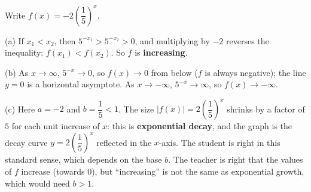 Write $f(x)=-2\left(\dfrac15\right)^x$.

(a) If $x_1<x_2$, then $5^{-x_1}>5^{-x_2}>0$, and multiplying by $-2$ reverses the inequality: $f(x_1)<f(x_2)$. So $f$ is \textbf{increasing}.

(b) As $x\to\infty$, $5^{-x}\to0$, so $f(x)\to0$ from below ($f$ is always negative); the line $y=0$ is a horizontal asymptote. As $x\to-\infty$, $5^{-x}\to\infty$, so $f(x)\to-\infty$.

(c) Here $a=-2$ and $b=\dfrac15<1$. The size $|f(x)|=2\left(\dfrac15\right)^x$ shrinks by a factor of $5$ for each unit increase of $x$: this is \textbf{exponential decay}, and the graph is the decay curve $y=2\left(\dfrac15\right)^x$ reflected in the $x$-axis. The student is right in this standard sense, which depends on the base $b$. The teacher is right that the values of $f$ increase (towards $0$), but ``increasing'' is not the same as exponential growth, which would need $b>1$.
